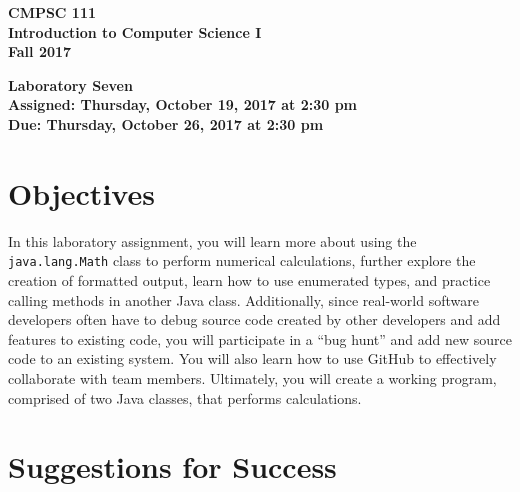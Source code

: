 \documentclass[11pt]{article}
\newcommand{\assignmentduedate}{October 26}
\newcommand{\assignmentassignedate}{October 19}
\newcommand{\assignmentnumber}{Seven}
\newcommand{\labyear}{2017}
\newcommand{\labday}{Thursday}
\newcommand{\labtime}{2:30 pm}
\newcommand{\assigneddate}{Assigned: \labday, \assignmentassignedate, \labyear{} at \labtime{}}
\newcommand{\duedate}{Due: \labday, \assignmentduedate, \labyear{} at \labtime{}}
\newcommand{\labtitle}[1]
{
  \begin{center}
    \begin{center}
      \bf
      CMPSC 111\\Introduction to Computer Science I\\
      Fall 2017\\
      \medskip
    \end{center}
    \bf
    #1
  \end{center}
}
\begin{document}
\thispagestyle{empty}

\labtitle{Laboratory \assignmentnumber{} \\ \assigneddate{} \\ \duedate{}}

\section*{Objectives}

In this laboratory assignment, you will learn more about using the {\tt java.lang.Math} class to perform numerical
calculations, further explore the creation of formatted output, learn how to use enumerated types, and practice calling
methods in another Java class. Additionally, since real-world software developers often have to debug source code
created by other developers and add features to existing code, you will participate in a ``bug hunt'' and add new source
code to an existing system. You will also learn how to use GitHub to effectively collaborate with team members.
Ultimately, you will create a working program, comprised of two Java classes, that performs calculations.

\section*{Suggestions for Success}
\end{document}
